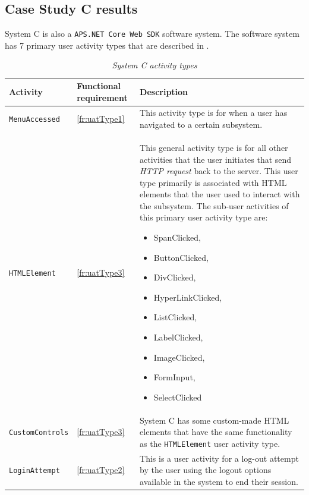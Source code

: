 \clearpage

\subsection{Case Study C results}\label{sec:ch3_csC}
System C is also a \texttt{APS.NET Core Web SDK} software system. The software system has 7 primary user activity types that are described in .

\begin{table}[!htb]
	\centering
	\caption[System A activity types]{\textit{System C activity types}}
	\label{tbl:ch3_systemCActivityTypes}
	\begin{tabularx}{\textwidth}{llX}
		\toprule
		\textbf{Activity} & \textbf{Functional requirement} & \textbf{Description} \\
		\midrule
		\rowcolor{lightgray}
		\texttt{MenuAccessed} & \ref{fr:uatType1} & \RaggedRight This activity type is for when a user has navigated to a certain subsystem. \\ 
		\texttt{HTMLElement} & \ref{fr:uatType3} & \RaggedRight This general activity type is for all other activities that the user initiates that send \textit{HTTP request} back to the server. This user type primarily is associated with HTML elements that the user used to interact with the subsystem. The sub-user activities of this primary user activity type are: \begin{itemize}
			\item SpanClicked,
			\item ButtonClicked, 
			\item DivClicked, 
			\item HyperLinkClicked,
			\item ListClicked, 
			\item LabelClicked, 
			\item ImageClicked, 
			\item FormInput, 
			\item SelectClicked
		\end{itemize} \\
		\rowcolor{lightgray}
		\texttt{CustomControls} & \ref{fr:uatType3} & \RaggedRight System C has some custom-made HTML elements that have the same functionality as the \texttt{HTMLElement} user activity type. \\ 
		\texttt{LoginAttempt} & \ref{fr:uatType2} & \RaggedRight This is a user activity for a log-out attempt by the user using the logout options available in the system to end their session. \\ 

\end{tabularx}
\end{table}

